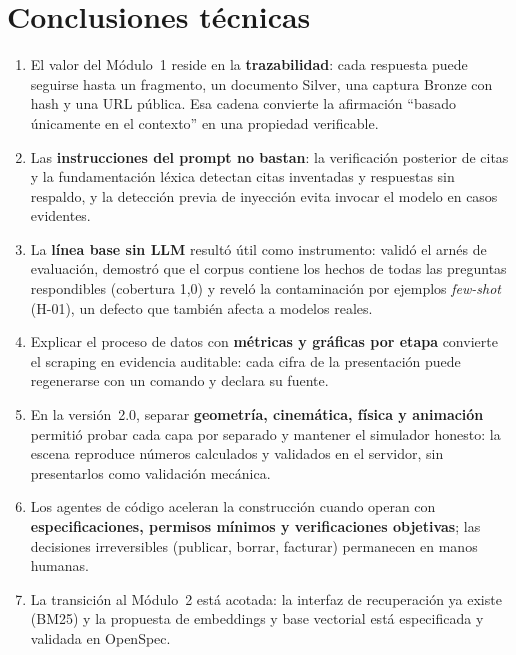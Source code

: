 \chapter{Conclusiones técnicas}\label{cap:conclusiones}
\begin{enumerate}
  \item El valor del Módulo~1 reside en la \textbf{trazabilidad}: cada respuesta puede seguirse hasta un
        fragmento, un documento Silver, una captura Bronze con hash y una URL pública. Esa cadena convierte la
        afirmación ``basado únicamente en el contexto'' en una propiedad verificable.
  \item Las \textbf{instrucciones del prompt no bastan}: la verificación posterior de citas y la fundamentación
        léxica detectan citas inventadas y respuestas sin respaldo, y la detección previa de inyección evita
        invocar el modelo en casos evidentes.
  \item La \textbf{línea base sin LLM} resultó útil como instrumento: validó el arnés de evaluación, demostró
        que el corpus contiene los hechos de todas las preguntas respondibles (cobertura 1,0) y reveló la
        contaminación por ejemplos \emph{few-shot} (H-01), un defecto que también afecta a modelos reales.
  \item Explicar el proceso de datos con \textbf{métricas y gráficas por etapa} convierte el scraping en evidencia
        auditable: cada cifra de la presentación puede regenerarse con un comando y declara su fuente.
  \item En la versión~2.0, separar \textbf{geometría, cinemática, física y animación} permitió probar cada capa por
        separado y mantener el simulador honesto: la escena reproduce números calculados y validados en el
        servidor, sin presentarlos como validación mecánica.
  \item Los agentes de código aceleran la construcción cuando operan con \textbf{especificaciones, permisos
        mínimos y verificaciones objetivas}; las decisiones irreversibles (publicar, borrar, facturar) permanecen
        en manos humanas.
  \item La transición al Módulo~2 está acotada: la interfaz de recuperación ya existe (BM25) y la propuesta de
        embeddings y base vectorial está especificada y validada en OpenSpec.
\end{enumerate}

